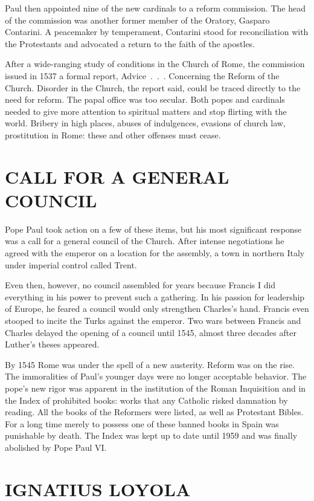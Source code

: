 Paul then appointed nine of the new cardinals to a reform commission. The head of the commission was
another former member of the Oratory, Gasparo Contarini. A peacemaker by temperament, Contarini
stood for reconciliation with the Protestants and advocated a return to the faith of the apostles.

After a wide-ranging study of conditions in the Church of Rome, the commission issued in 1537 a
formal report, Advice~.~.~. Concerning the Reform of the Church. Disorder in the Church, the report
said, could be traced directly to the need for reform. The papal office was too secular. Both popes
and cardinals needed to give more attention to spiritual matters and stop flirting with the world.
Bribery in high places, abuses of indulgences, evasions of church law, prostitution in Rome: these
and other offenses must cease.

\section{CALL FOR A GENERAL COUNCIL}

Pope Paul took action on a few of these items, but his most significant response was a call for a
general council of the Church. After intense negotiations he agreed with the emperor on a location
for the assembly, a town in northern Italy under imperial control called Trent.

Even then, however, no council assembled for years because Francis I did everything in his power to
prevent such a gathering. In his passion for leadership of Europe, he feared a council would only
strengthen Charles’s hand. Francis even stooped to incite the Turks against the emperor. Two wars
between Francis and Charles delayed the opening of a council until 1545, almost three decades after
Luther’s theses appeared.

By 1545 Rome was under the spell of a new austerity. Reform was on the rise. The immoralities of
Paul’s younger days were no longer acceptable behavior. The pope’s new rigor was apparent in the
institution of the Roman Inquisition and in the Index of prohibited books: works that any Catholic
risked damnation by reading. All the books of the Reformers were listed, as well as Protestant
Bibles. For a long time merely to possess one of these banned books in Spain was punishable by
death. The Index was kept up to date until 1959 and was finally abolished by Pope Paul VI.

\section{IGNATIUS LOYOLA}


